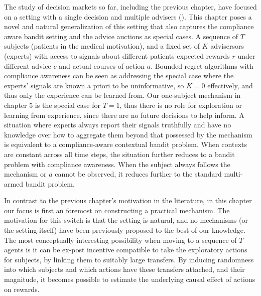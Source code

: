 The study of decision markets so far, including the previous chapter, have focused on a setting with a single decision and multiple advisers (\cite{hanson2002decision,othman2010decision,chen2014eliciting}).
This chapter poses a novel and natural generalization of this setting that also captures the compliance aware bandit setting and the advice auctions as special cases. 
A sequence of $T$ subjects (patients in the medical motivation), and a fixed set of $K$ advisersors (experts) with access to signals about different patients expected rewards $r$ under different advice $c$ and actual courses of action $a$. 
Bounded regret algorithms with compliance awareness can be seen as addressing the special case where the experts' signals are known a priori to be uninformative, so $K=0$ effectively, and thus only the experience can be learned from.
Our one-subject mechanism in chapter 5 is the special case for $T={1}$, thus there is no role for exploration or learning from experience, since there are no future decisions to help inform.
A situation where experts always report their signals truthfully and have no knowledge over how to aggregate them beyond that possessed by the mechanism is equivalent to a compliance-aware contextual bandit problem. 
When contexts are constant across all time steps, the situation further reduces to a bandit problem with compliance awareness.
When the subject always follows the mechanism or $a$ cannot be observed, it reduces further  to the standard multi-armed bandit problem. 


In contrast to the previous chapter's motivation in the literature, in this chapter our focus is first an foremost on constructing a practical mechanism. 
The motivation for this switch is that the setting is natural, and no mechanisms (or the setting itself) have been previously proposed to the best of our knowledge.
The most conceptually interesting possibility when moving to a sequence of $T$ agents is it can be ex-post incentive compatible to take the exploratory actions for subjects, by linking them to suitably large transfers. By inducing randomness into which subjects and which actions have these transfers attached, and their magnitude, it becomes possible to estimate the underlying causal effect of actions on rewards. 


